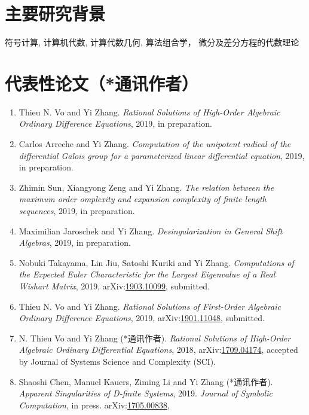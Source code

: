 \documentclass[a4paper,12pt]{article}
\begin{document}
\begin{CJK*}{UTF8}{gbsn}
\section*{\Large{主要研究背景}}
符号计算, 计算机代数, 计算代数几何, 算法组合学， 微分及差分方程的代数理论

\section*{\Large{代表性论文（*通讯作者）}}
\begin{enumerate}
\item Thieu N. Vo and Yi Zhang. 
{\em Rational Solutions of High-Order Algebraic Ordinary Difference Equations}, 2019, in preparation.
\item Carlos Arreche and Yi Zhang.
{\em Computation of the unipotent radical of the differential Galois group for a parameterized linear differential equation}, 2019, in preparation. 
\item Zhimin Sun,  Xiangyong Zeng and Yi Zhang. 
{\em The relation between the maximum order
omplexity and expansion complexity of finite length sequences}, 2019, in preparation.
\item Maximilian Jaroschek and Yi Zhang. 
{\em Desingularization in General Shift Algebras}, 2019, in preparation.
\item Nobuki Takayama, Lin Jiu, Satoshi Kuriki and Yi Zhang. 
 {\em Computations of the Expected Euler Characteristic for the Largest Eigenvalue of a Real Wishart Matrix}, 2019, 
 arXiv:\href{http://arxiv.org/abs/1903.10099}{1903.10099}, submitted.
  \item Thieu N. Vo and Yi Zhang. 
{\em Rational Solutions of First-Order Algebraic Ordinary Difference Equations}, 2019,  
arXiv:\href{http://arxiv.org/abs/1901.11048}{1901.11048}, submitted.
  \item N. Thieu Vo and Yi Zhang (*通讯作者). {\em Rational Solutions of High-Order Algebraic Ordinary Differential Equations}, 2018, 
  arXiv:\href{https://arxiv.org/abs/1709.04174}{1709.04174}, accepted by Journal of Systems Science and Complexity (SCI).
   \item Shaoshi Chen, Manuel Kauers, Ziming Li and Yi Zhang  (*通讯作者). {\em Apparent Singularities of D-finite Systems}, 2019. 
 {\em  Journal of Symbolic Computation}, in press. arXiv:\href{http://arxiv.org/abs/1705.00838}{1705.00838},  

\end{enumerate}
\end{CJK*}
\end{document}
